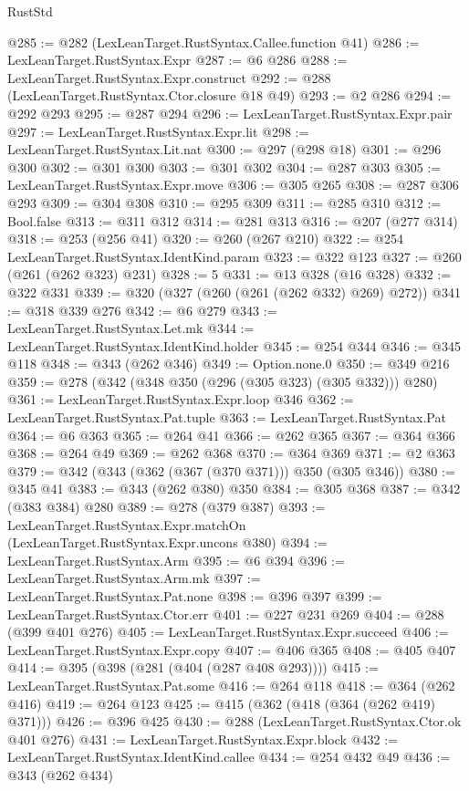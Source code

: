 \begin{lexlean}{RustStd}
\begin{coremodule}
@285 := @282 (LexLeanTarget.RustSyntax.Callee.function @41)
@286 := LexLeanTarget.RustSyntax.Expr
@287 := @6 @286
@288 := LexLeanTarget.RustSyntax.Expr.construct
@292 := @288 (LexLeanTarget.RustSyntax.Ctor.closure @18 @49)
@293 := @2 @286
@294 := @292 @293
@295 := @287 @294
@296 := LexLeanTarget.RustSyntax.Expr.pair
@297 := LexLeanTarget.RustSyntax.Expr.lit
@298 := LexLeanTarget.RustSyntax.Lit.nat
@300 := @297 (@298 @18)
@301 := @296 @300
@302 := @301 @300
@303 := @301 @302
@304 := @287 @303
@305 := LexLeanTarget.RustSyntax.Expr.move
@306 := @305 @265
@308 := @287 @306 @293
@309 := @304 @308
@310 := @295 @309
@311 := @285 @310
@312 := Bool.false
@313 := @311 @312
@314 := @281 @313
@316 := @207 (@277 @314)
@318 := @253 (@256 @41)
@320 := @260 (@267 @210)
@322 := @254 LexLeanTarget.RustSyntax.IdentKind.param
@323 := @322 @123
@327 := @260 (@261 (@262 @323) @231)
@328 := 5
@331 := @13 @328 (@16 @328)
@332 := @322 @331
@339 := @320 (@327 (@260 (@261 (@262 @332) @269) @272))
@341 := @318 @339 @276
@342 := @6 @279
@343 := LexLeanTarget.RustSyntax.Let.mk
@344 := LexLeanTarget.RustSyntax.IdentKind.holder
@345 := @254 @344
@346 := @345 @118
@348 := @343 (@262 @346)
@349 := Option.none.{0}
@350 := @349 @216
@359 := @278 (@342 (@348 @350 (@296 (@305 @323) (@305 @332))) @280)
@361 := LexLeanTarget.RustSyntax.Expr.loop @346
@362 := LexLeanTarget.RustSyntax.Pat.tuple
@363 := LexLeanTarget.RustSyntax.Pat
@364 := @6 @363
@365 := @264 @41
@366 := @262 @365
@367 := @364 @366
@368 := @264 @49
@369 := @262 @368
@370 := @364 @369
@371 := @2 @363
@379 := @342 (@343 (@362 (@367 (@370 @371))) @350 (@305 @346))
@380 := @345 @41
@383 := @343 (@262 @380) @350
@384 := @305 @368
@387 := @342 (@383 @384) @280
@389 := @278 (@379 @387)
@393 := LexLeanTarget.RustSyntax.Expr.matchOn (LexLeanTarget.RustSyntax.Expr.uncons @380)
@394 := LexLeanTarget.RustSyntax.Arm
@395 := @6 @394
@396 := LexLeanTarget.RustSyntax.Arm.mk
@397 := LexLeanTarget.RustSyntax.Pat.none
@398 := @396 @397
@399 := LexLeanTarget.RustSyntax.Ctor.err
@401 := @227 @231 @269
@404 := @288 (@399 @401 @276)
@405 := LexLeanTarget.RustSyntax.Expr.succeed
@406 := LexLeanTarget.RustSyntax.Expr.copy
@407 := @406 @365
@408 := @405 @407
@414 := @395 (@398 (@281 (@404 (@287 @408 @293))))
@415 := LexLeanTarget.RustSyntax.Pat.some
@416 := @264 @118
@418 := @364 (@262 @416)
@419 := @264 @123
@425 := @415 (@362 (@418 (@364 (@262 @419) @371)))
@426 := @396 @425
@430 := @288 (LexLeanTarget.RustSyntax.Ctor.ok @401 @276)
@431 := LexLeanTarget.RustSyntax.Expr.block
@432 := LexLeanTarget.RustSyntax.IdentKind.callee
@434 := @254 @432 @49
@436 := @343 (@262 @434)

\end{coremodule}
\end{lexlean}
